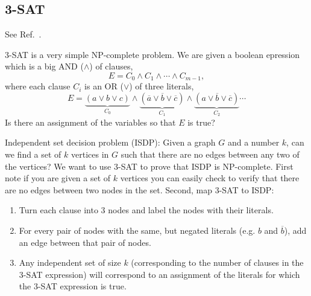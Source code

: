 \documentclass[12pt]{article}
\begin{document}
\subsection{3-SAT}
\newcommand*\AND{\wedge}
\newcommand*\OR{\vee}
\newcommand*\NOT[1]{\overline{#1}}
See Ref.~.

3-SAT is a very simple NP-complete problem. We are given a boolean epression
which is a big AND ($\AND$) of clauses,
\[E = C_0 \AND C_1 \AND \cdots \AND C_{m-1},\]
where each clause $C_i$ is an OR ($\OR$) of three literals,
\[E = \underbrace{(a \OR b \OR c)}_{C_0} \AND \underbrace{(\NOT a \OR \NOT b
\OR \NOT c)}_{C_1} \AND \underbrace{(a \OR \NOT b \OR \NOT c)}_{C_2} \cdots \]
Is there an assignment of the variables so that $E$ is true?

Independent set decision problem (ISDP): Given a graph $G$
and a number $k$, can we find a set of $k$ vertices in $G$ such that there are
no edges between any two of the vertices? We want to use 3-SAT to prove that
ISDP is NP-complete. First note if you are given a set of $k$ vertices you can
easily check to verify that there are no edges between two nodes in the set.
Second, map 3-SAT to ISDP:
\begin{enumerate}
    \item Turn each clause into 3 nodes and label the nodes with their
        literals.
    \item For every pair of nodes with the same, but negated literals (e.g. $b$
        and $\NOT b$), add an edge between that pair of nodes.
    \item Any independent set of size $k$ (corresponding to the number of
        clauses in the 3-SAT expression) will correspond to an assignment of
        the literals for which the 3-SAT expression is true.
\end{enumerate}
\end{document}

